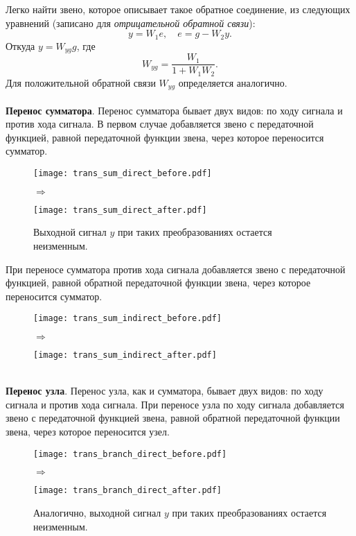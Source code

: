 \documentclass[../../TAU.tex]{subfiles}
\begin{document}
    Легко найти звено, которое описывает такое обратное соединение, из следующих уравнений (записано для {\it отрицательной обратной связи}):
    $$
        y = W_1 e, \quad e = g- W_2 y.
    $$
    Откуда $y = W_{yg}g$, где
    $$
        W_{yg} = \frac{W_1}{1+W_1 W_2}.
    $$
    Для положительной обратной связи $W_{yg}$ определяется аналогично.\\\\
    {\bf Перенос сумматора}. Перенос сумматора бывает двух видов: по ходу сигнала и против хода сигнала. В первом случае добавляется звено с передаточной функцией, равной передаточной функции звена, через которое переносится сумматор.

    \begin{figure}[h]
        \begin{minipage}[h]{0.45\linewidth}
            \texttt{[image: trans\_sum\_direct\_before.pdf]}
        \end{minipage}
        $\Longrightarrow$
        \begin{minipage}[h]{0.45\linewidth}
            \texttt{[image: trans\_sum\_direct\_after.pdf]}
        \end{minipage}
        \caption{Выходной сигнал $y$ при таких преобразованиях остается неизменным.}
    \end{figure}
    При переносе сумматора против хода сигнала добавляется звено с передаточной функцией, равной обратной передаточной функции звена, через которое переносится сумматор.  
    \begin{figure}[h]
        \begin{minipage}[h]{0.45\linewidth}
           \texttt{[image: trans\_sum\_indirect\_before.pdf]}
        \end{minipage}
        $\Longrightarrow$
        \begin{minipage}[h]{0.45\linewidth}
            \texttt{[image: trans\_sum\_indirect\_after.pdf]}
        \end{minipage}
    \end{figure}\\
    {\bf Перенос узла}. Перенос узла, как и сумматора, бывает двух видов: по ходу сигнала и против хода сигнала. При переносе узла по ходу сигнала добавляется звено с передаточной функцией звена, равной обратной передаточной функции звена, через которое переносится узел.
    \begin{figure}[h]
        \begin{minipage}[h]{0.45\linewidth}
            \texttt{[image: trans\_branch\_direct\_before.pdf]}
        \end{minipage}
    $\Longrightarrow$
        \begin{minipage}[h]{0.45\linewidth}
            \texttt{[image: trans\_branch\_direct\_after.pdf]}
        \end{minipage}
        \caption{Аналогично, выходной сигнал $y$ при таких преобразованиях остается неизменным.}
    \end{figure}
\end{document}
